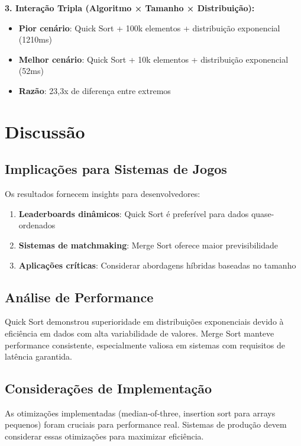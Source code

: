 \documentclass[conference]{IEEEtran}
\begin{document}
\textbf{3. Interação Tripla (Algoritmo × Tamanho × Distribuição):}
\begin{itemize}
\item \textbf{Pior cenário}: Quick Sort + 100k elementos + distribuição exponencial (1210ms)
\item \textbf{Melhor cenário}: Quick Sort + 10k elementos + distribuição exponencial (52ms)
\item \textbf{Razão}: 23,3x de diferença entre extremos
\end{itemize}

\section{Discussão}

\subsection{Implicações para Sistemas de Jogos}

Os resultados fornecem insights para desenvolvedores:

\begin{enumerate}
\item \textbf{Leaderboards dinâmicos}: Quick Sort é preferível para dados quase-ordenados
\item \textbf{Sistemas de matchmaking}: Merge Sort oferece maior previsibilidade
\item \textbf{Aplicações críticas}: Considerar abordagens híbridas baseadas no tamanho
\end{enumerate}

\subsection{Análise de Performance}

Quick Sort demonstrou superioridade em distribuições exponenciais devido à eficiência em dados com alta variabilidade de valores. Merge Sort manteve performance consistente, especialmente valiosa em sistemas com requisitos de latência garantida.

\subsection{Considerações de Implementação}

As otimizações implementadas (median-of-three, insertion sort para arrays pequenos) foram cruciais para performance real. Sistemas de produção devem considerar essas otimizações para maximizar eficiência.
\end{document}
